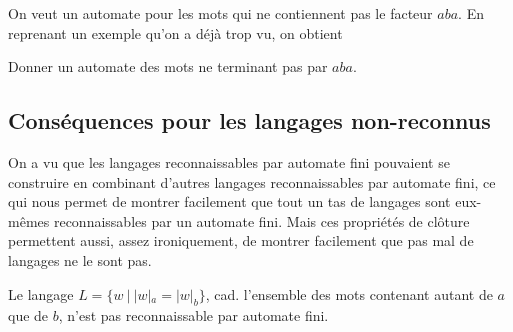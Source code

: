 \begin{example}
\label{autopasaba}
On veut un automate pour les mots qui ne contiennent pas le facteur $aba$. En reprenant un exemple qu'on a déjà trop vu, on obtient 


\begin{figure}[H]
\centering
{}
\end{figure}
\end{example}

\begin{exercice}
Donner un automate des mots ne terminant pas par $aba$.
\end{exercice}


\subsection{Conséquences pour les langages non-reconnus}

On a vu que les langages reconnaissables par automate fini pouvaient se construire en combinant d'autres langages reconnaissables par automate fini, ce qui nous permet de montrer facilement que tout un tas de langages sont eux-mêmes reconnaissables par un automate fini. Mais ces propriétés de clôture permettent aussi, assez ironiquement, de montrer facilement que pas mal de langages ne le sont pas.

\begin{theorem}
Le langage $L = \{w ~|~ |w|_a = |w|_b\}$, cad. l'ensemble des mots contenant autant de $a$ que de $b$, n'est pas reconnaissable par automate fini.
\end{theorem}

